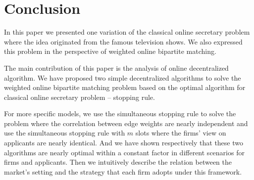 \chapter{Conclusion}\label{chap:conclusion}

In this paper we presented one variation of the classical online secretary
problem where the idea originated from the famous television shows.
We also expressed this problem in the perspective of 
weighted online bipartite matching.

The main contribution of this paper is the analysis of online decentralized
algorithm. We have proposed two simple decentralized algorithms to solve
the weighted online bipartite matching problem based on the optimal
algorithm for classical online secretary problem -- stopping rule.

For more specific models,
we use the simultaneous stopping rule to solve the problem where the
correlation between edge weights are nearly independent and
use the simultaneous stopping rule with $m$ slots where the firms' view
on applicants are nearly identical.
And we have shown respectively that these two algorithms 
are nearly optimal within a constant factor in different scenarios 
for firms and applicants.
Then we intuitively describe the relation between the market's setting
and the strategy that each firm adopts under this framework.

